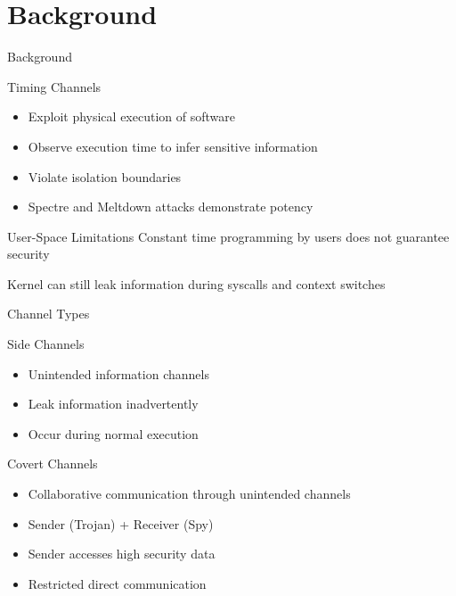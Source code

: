 \section{Background}

\begin{frame}{Background}
	\begin{block}{Timing Channels}
		\begin{itemize}
			\item Exploit physical execution of software
			\item Observe execution time to infer sensitive information
			\item Violate isolation boundaries
			\item Spectre and Meltdown attacks demonstrate potency
		\end{itemize}
	\end{block}
  \pause
	\begin{alertblock}{User-Space Limitations}
		Constant time programming by users does not guarantee security

		Kernel can still leak information during syscalls and context switches
	\end{alertblock}
\end{frame}

\begin{frame}{Channel Types}
    \begin{block}{Side Channels}
      \begin{itemize}
        \item Unintended information channels
        \item Leak information inadvertently
        \item Occur during normal execution
    \end{itemize}
  \end{block}

  \begin{block}{Covert Channels}
    \begin{itemize}
      \item Collaborative communication through unintended channels
      \item Sender (Trojan) + Receiver (Spy)
      \item Sender accesses high security data
      \item Restricted direct communication
      \end{itemize}
    \end{block}
\end{frame}


